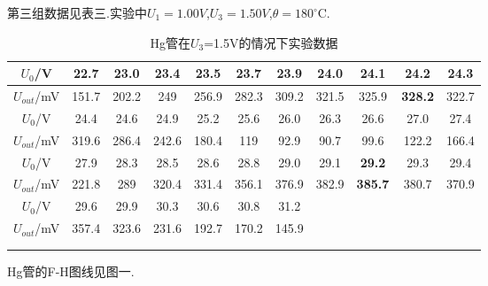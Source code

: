 \documentclass[a4paper,10pt,notitlepage]{article}
\begin{document}
	第三组数据见表三.实验中$U_1 = 1.00V$,$U_3 = 1.50V$,$\theta = 180^\circ$C.
	
\begin{center}

	\begin{longtable}{|c|c|c|c|c|c|c|c|c|c|c|}
	\hline
	$U_0$/V & 22.7 & 23.0 & 23.4 & 23.5 & 23.7 & 23.9 & 24.0 & 24.1 & \textbf{24.2} & 24.3 \\
	\hline
	$U_{out}$/mV & 151.7 & 202.2 & 249 & 256.9 & 282.3 & 309.2 & 321.5 & 325.9 & \textbf{328.2} & 322.7 \\
	\hline
	\hline
	$U_0$/V & 24.4 & 24.6 & 24.9 & 25.2 & 25.6 & 26.0 & 26.3 & 26.6 & 27.0 & 27.4 \\
	\hline
	$U_{out}$/mV & 319.6 & 286.4 & 242.6 & 180.4 & 119 & 92.9 & 90.7 & 99.6 & 122.2 & 166.4 \\
	\hline
	\hline
	$U_0$/V & 27.9 & 28.3 & 28.5 & 28.6 & 28.8 & 29.0 & 29.1 & \textbf{29.2} & 29.3 & 29.4 \\
	\hline
	$U_{out}$/mV & 221.8 & 289 & 320.4 & 331.4 & 356.1 & 376.9 & 382.9 & \textbf{385.7} & 380.7 & 370.9 \\
	\hline
	\hline
	$U_0$/V & 29.6 & 29.9 & 30.3 & 30.6 & 30.8 & 31.2 & &&& \\
	\hline
	$U_{out}$/mV & 357.4 & 323.6 & 231.6 & 192.7 & 170.2 & 145.9 &&&&  \\
	\hline
	\multicolumn{1}{c}{ } \\
	\caption{Hg管在$U_3$=1.5V的情况下实验数据}
	\end{longtable}

\end{center}

	Hg管的F-H图线见图一.
\end{document}
